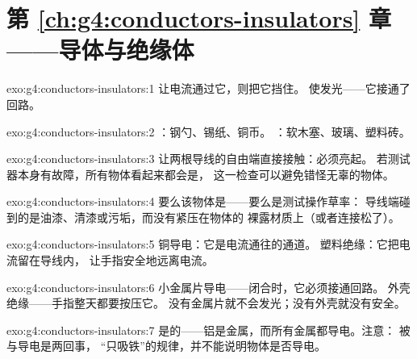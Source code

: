 \section*{第 \ref{ch:g4:conductors-insulators} 章——导体与绝缘体}

\begin{solution}{exo:g4:conductors-insulators:1}
让电流通过它，则把它挡住。
使发光——它接通了回路。
\end{solution}

\begin{solution}{exo:g4:conductors-insulators:2}
：钢勺、锡纸、铜币。
：软木塞、玻璃、塑料砖。
\end{solution}

\begin{solution}{exo:g4:conductors-insulators:3}
让两根导线的自由端直接接触：必须亮起。
若测试器本身有故障，所有物体看起来都会是，
这一检查可以避免错怪无辜的物体。
\end{solution}

\begin{solution}{exo:g4:conductors-insulators:4}
要么该物体是——要么是测试操作草率：
导线端碰到的是油漆、清漆或污垢，而没有紧压在物体的
裸露材质上（或者连接松了）。
\end{solution}

\begin{solution}{exo:g4:conductors-insulators:5}
铜导电：它是电流通往的通道。
塑料绝缘：它把电流留在导线内，
让手指安全地远离电流。
\end{solution}

\begin{solution}{exo:g4:conductors-insulators:6}
小金属片导电——闭合时，它必须接通回路。
外壳绝缘——手指整天都要按压它。
没有金属片就不会发光；没有外壳就没有安全。
\end{solution}

\begin{solution}{exo:g4:conductors-insulators:7}
是的——铝是金属，而所有金属都导电。注意：
被与导电是两回事，
“只吸铁”的规律，并不能说明物体是否导电。
\end{solution}

